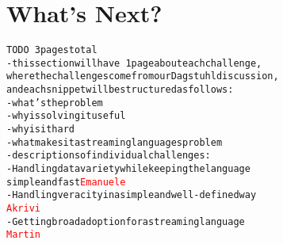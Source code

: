 \section{What's Next?}\label{sec:whatsnext}

\begin{alltt}TODO\scriptsize ~3 pages total
- this section will have ~1 page about each challenge,
  where the challenges come from our Dagstuhl discussion,
  and each snippet will be structured as follows:
  - what's the problem
  - why is solving it useful
  - why is it hard
  - what makes it a streaming languages problem
- descriptions of individual challenges:
  - Handling data variety while keeping the language
    simple and fast \textcolor{red}{Emanuele}
  - Handling veracity in a simple and well-defined way
    \textcolor{red}{Akrivi}
  - Getting broad adoption for a streaming language
    \textcolor{red}{Martin}
\end{alltt}




